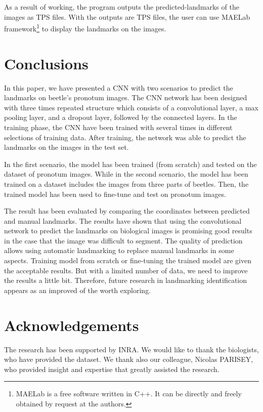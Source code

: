 \documentclass[10pt]{article}
\begin{document}
As a result of working, the program outputs the
predicted-landmarks of the images as TPS files. With the outputs are TPS files,
the user can use MAELab framework\footnote{MAELab is a free software written in C++. It can be directly and freely
obtained by request at the authors.} to display the
landmarks on the images.
\section{Conclusions}
In this paper, we have presented a CNN with two scenarios to predict the landmarks on beetle's pronotum images. The CNN network has been designed with three times repeated structure which consists of a convolutional layer, a max pooling layer, and a dropout layer, followed by the connected layers. In the training phase, the CNN have been trained with several times in different selections of training data. After training, the network was able to predict the landmarks on the images in the test set. 

In the first scenario, the model has been trained (from scratch) and tested on the dataset of pronotum images. While in the second scenario, the model has been trained on a dataset includes the images from three parts of beetles. Then, the trained model has been used to fine-tune and test on pronotum images.

The result has been evaluated by comparing the coordinates between predicted and manual landmarks.  The results have shown that using the convolutional network to predict the landmarks on biological images is promising good results in the case that the image was difficult to segment. The quality of prediction allows using automatic landmarking to replace manual landmarks in some aspects. Training model from scratch or fine-tuning the trained model are given the acceptable results. But with a limited number of data, we need to improve the results a little bit. Therefore, future research in landmarking identification appears as an improved of the worth exploring.

\section*{Acknowledgements}
The research has been supported by INRA. We would like to thank the biologists, who have provided the dataset. We thank also our colleague, Nicolas PARISEY, who provided insight and expertise that greatly assisted the research.


\end{document}
